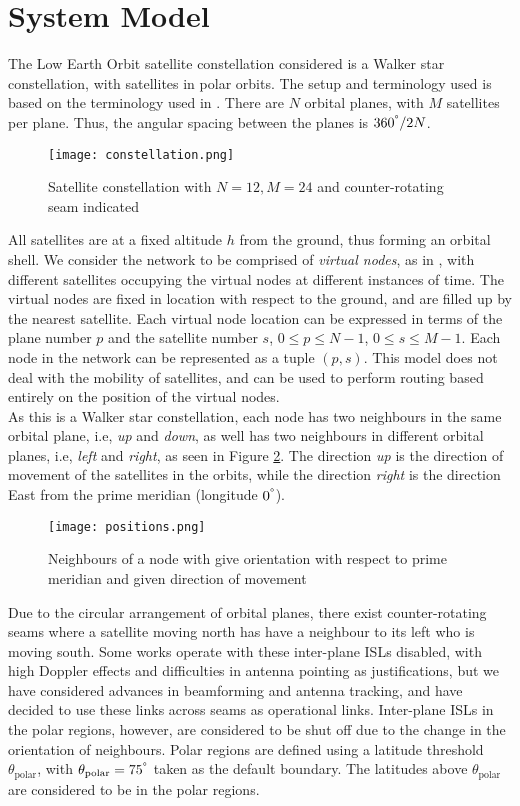 \documentclass[10pt,conference, final, letterpaper]{IEEEtran}
\begin{document}
\section{System Model}
The Low Earth Orbit satellite constellation considered is a Walker star constellation, with satellites in polar orbits. The setup and terminology used is based on the terminology used in \cite{ekici-datagram}. There are $N$ orbital planes, with $M$ satellites per plane. Thus, the angular spacing between the planes is ${360^\degree}/{2N}$.
\begin{figure}
	\centering
	\texttt{[image: constellation.png]}
	\caption{Satellite constellation with $N=12, M=24$ and counter-rotating seam indicated}
	\label{fig:constellation}
\end{figure}
 All satellites are at a fixed altitude $h$ from the ground, thus forming an orbital shell. We consider the network to be comprised of \textit{virtual nodes}, as in \cite{ekici-datagram}, with different satellites occupying the virtual nodes at different instances of time. The virtual nodes are fixed in location with respect to the ground, and are filled up by the nearest satellite. Each virtual node location can be expressed in terms of the plane number $p$ and the satellite number $s$, $0\leq p \leq N-1$, $0\leq s \leq M-1$. Each node in the network can be represented as a tuple $(p,s)$. This model does not deal with the mobility of satellites, and can be used to perform routing based entirely on the position of the virtual nodes. \\
As this is a Walker star constellation, each node has two neighbours in the same orbital plane, i.e, \textit{up} and \textit{down}, as well has two neighbours in different orbital planes, i.e, \textit{left} and \textit{right}, as seen in Figure \ref{fig:positions}. The direction \textit{up} is the direction of movement of the satellites in the orbits, while the direction \textit{right} is the direction East from the prime meridian (longitude $0^\degree$).
\begin{figure}
	\centering
	\texttt{[image: positions.png]}
	\caption{Neighbours of a node with give orientation with respect to prime meridian and given direction of movement}
	\label{fig:positions}
\end{figure}
Due to the circular arrangement of orbital planes, there exist counter-rotating seams where a satellite moving north has have a neighbour to its left who is moving south. Some works operate with these inter-plane ISLs disabled, with high Doppler effects and difficulties in antenna pointing as justifications, but we have considered advances in beamforming and antenna tracking, and have decided to use these links across seams as operational links. Inter-plane ISLs in the polar regions, however, are considered to be shut off due to the change in the orientation of neighbours. Polar regions are defined using a latitude threshold $\theta_{\text{polar}}$, with $\theta_{\text{polar}} = 75^\degree$ taken as the default boundary. The latitudes above $\theta_{\text{polar}}$ are considered to be in the polar regions.\\
\end{document}

